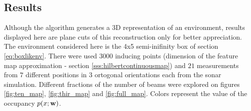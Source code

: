 \subsection{Results}

Although the algorithm generates a 3D representation of an environment, results
displayed here are plane cuts of this reconstruction only for better
appreciation. The environment considered here is the 4x5 semi-inifinity box of
section \ref{eq:boxlikenv}. There were used $3000$ inducing points (dimension of
the feature map approximation - section \ref{sss:hilbertcontinuousmap}) and $21$
measurements from $7$ different positions in $3$ ortogonal orientations each
from the sonar simulation. Different fractions of the number of beams were
explored on figures \ref{fig:ten_map}, \ref{fig:thir_map} and
\ref{fig:full_map}. Colors represent the value of the occupancy
$p(x;\mathrm{\mathbf{w}})$.

